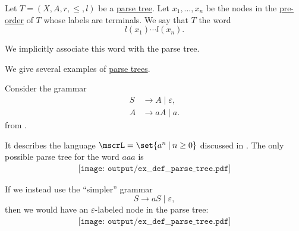 \begin{definition}\label{def:parse_tree_word}\mimprovised
  Let \( T = (X, A, r, \leq, l) \) be a \hyperref[def:parse_tree]{parse tree}. Let \( x_1, \ldots, x_n \) be the nodes in the \hyperref[def:traversal_ordering]{pre-order} of \( T \) whose labels are terminals. We say that \( T \)  the word
  \begin{equation*}
    l(x_1) \cdots l(x_n).
  \end{equation*}

  We implicitly associate this word with the parse tree.
\end{definition}

\begin{example}\label{ex:def:parse_tree}
  We give several examples of \hyperref[def:parse_tree]{parse trees}.

  \begin{thmenum}
     Consider the grammar
    \begin{equation*}
      \begin{aligned}
        S &\to A \mid \varepsilon, \\
        A &\to aA \mid a.
      \end{aligned}
    \end{equation*}
    from .

    It describes the language \( \mscrL = \set{ a^n \given n \geq 0 } \) discussed in . The only possible parse tree for the word \( aaa \) is
    \begin{equation*}\label{eq:ex:def:parse_tree/an}
      \begin{aligned}
        \texttt{[image: output/ex\_\_def\_\_parse\_tree.pdf]}
      \end{aligned}
    \end{equation*}

    If we instead use the \enquote{simpler} grammar
    \begin{equation*}
      S \to aS \mid \varepsilon,
    \end{equation*}
    then we would have an \( \varepsilon \)-labeled node in the parse tree:
    \begin{equation*}
      \begin{aligned}
        \texttt{[image: output/ex\_\_def\_\_parse\_tree.pdf]}
      \end{aligned}
    \end{equation*}


\end{thmenum}
\end{example}
